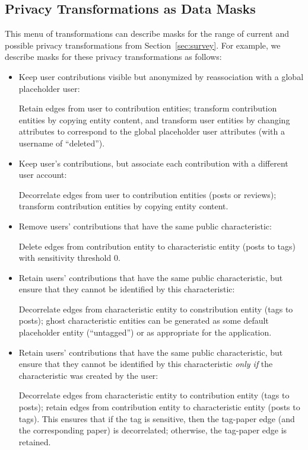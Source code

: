 \subsection{Privacy Transformations as Data Masks}
This menu of transformations can describe masks for the range of current and possible privacy
transformations from Section~\ref{sec:survey}. For example, we describe masks for these privacy
transformations as follows:
\begin{itemize}[nosep]
    \item Keep user contributions visible but anonymized by reassociation with a global
        placeholder user:

        Retain edges from user to contribution entities; transform contribution entities by copying
        entity content, and transform user entities by changing attributes to correspond to the
        global placeholder user attributes (\eg with a username of ``deleted'').

    \item Keep user's contributions, but associate each contribution with a different user account:

        Decorrelate edges from user to contribution entities (\eg posts or reviews); transform
        contribution entities by copying entity content. 

    \item Remove users' contributions that have the same public characteristic: 

        Delete edges from contribution entity to characteristic entity (\eg posts to tags) with
        sensitivity threshold 0.

    \item Retain users' contributions that have the same public characteristic, but ensure that they
        cannot be identified by this characteristic:

        Decorrelate edges from characteristic entity to constribution entity (\eg tags to posts);
        ghost characteristic entities can be generated as some default placeholder entity (\eg ``untagged'') or
        as appropriate for the application.

    \item Retain users' contributions that have the same public characteristic, but ensure that they
        cannot be identified by this characteristic \emph{only if} the characteristic was created by
        the user:

        Decorrelate edges from characteristic entity to contribution entity (\eg tags to posts); retain
        edges from contribution entity to characteristic entity (\eg posts to tags). This
        ensures that if the tag is sensitive, then the tag-paper edge (and the corresponding paper)
        is decorrelated; otherwise, the tag-paper edge is retained.
        

\end{itemize}
